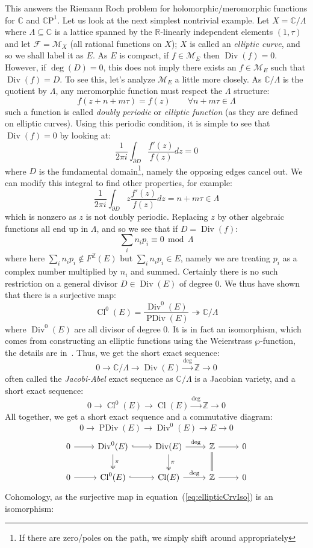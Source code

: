 \documentclass{ut-thesis}
\newcommand{\R}{{\mathbb{R}}}
\newcommand{\Z}{{\mathbb{Z}}}
\newcommand{\C}{{\mathbb{C}}}
\newcommand{\CM}{{\mathcal{M}}}
\newcommand{\CF}{{\mathcal{F}}}
\newcommand{\CP}{{\mathbb{C}\mathrm{P}}}
\newcommand{\sse}{\subseteq}
\renewcommand{\mod}{\,\operatorname{mod}\,}
\newcommand{\Div}{{\operatorname{Div}}}
\newcommand{\PDiv}{{\operatorname{PDiv}}}
\renewcommand{\deg}{{\operatorname{deg}}}
\renewcommand{\div}{{\operatorname{Div}}}
\newcommand{\Cl}{{\operatorname{Cl}}}
\begin{document}
This answers the Riemann Roch problem for holomorphic/meromorphic functions for $\C$ and $\CP^1$. Let us look
at the next simplest nontrivial example. Let $X = \C/\Lambda$ where $\Lambda\sse \C$ is a lattice spanned by
the $\R$-linearly independent elements $(1,\tau)$ and let $\CF = \CM_X$ (all rational functions on $X$); $X$
is called an \emph{elliptic curve}, and so we shall label it as $E$. As $E$ is compact, if $f \in \CM_E$ then
$\div(f) = 0$. However, if $\deg(D) = 0$, this does not imply there exists an $f \in \CM_E$ such that $\div(f)
= D$. To see this, let's analyze $\CM_E$ a little more closely. As $\C/\Lambda$ is the quotient by $\Lambda$,
any meromorphic function must respect the $\Lambda$ structure:
\[
  f(z+n+m\tau) = f(z) \qquad \forall n+m\tau \in \Lambda
\]
such a function is called \emph{doubly periodic} or \emph{elliptic function} (as they are defined on elliptic
curves). Using this periodic condition, it is simple to see that
$\div(f) = 0$ by looking at:
\[
  \frac{1}{2\pi i}\int_{\partial D} \frac{f'(z)}{f(z)}dz = 0
\]
where $D$ is the fundamental domain\footnote{If there are zero/poles on the path, we simply shift around
appropriately}, namely the opposing edges cancel out. We can modify this integral to find other properties,
for example:
\[
  \frac{1}{2\pi i}\int_{\partial D} z\frac{f'(z)}{f(z)}dz = n + m\tau \in \Lambda
\]
which is nonzero as $z$ is not doubly periodic. Replacing $z$ by other algebraic functions all end up in
$\Lambda$, and so we see that if $D = \div(f)$:
\[
  \sum_i n_ip_i \equiv 0 \mod \Lambda
\]
where here $\sum_i n_ip_i\notin F^\Z(E)$ but $\sum_i n_ip_i \in E$, namely we are treating $p_i$ as a complex
number multiplied by $n_i$ and summed. Certainly there is no such restriction on
a general divisor $D \in \Div(E)$ of degree $0$. We thus have shown that there is a surjective map:
\begin{equation}\label{eq:ellipticCrvIso}
  \Cl^0(E) = \frac{\Div^0(E)}{\PDiv(E)} \twoheadrightarrow \C/\Lambda
\end{equation}
where $\Div^0(E)$ are all divisor of degree $0$. It is in fact an isomorphism, which comes from constructing
an elliptic functions using the Weierstrass $\wp$-function, the details are
in~\cite[chapter~5]{NateComplexAnalysis}. Thus, we get the short exact sequence:
\[
  0 \to \C/\Lambda \to \Div(E) \xrightarrow{\deg} \Z \to 0
\]
often called the \emph{Jacobi-Abel} exact sequence as $\C/\Lambda$ is a Jacobian variety, and a short exact sequence:
\[
  0 \to \Cl^0(E) \to \Cl(E) \xrightarrow{\deg} \Z \to 0
\]
All together, we get a short exact sequence and a commutative diagram:
\[
  0 \to \PDiv(E) \to \Div^0(E) \to E \to 0
\]
\[
\begin{tikzcd}
0 \arrow[r] & \mathrm{Div}^0(E) \arrow[r, hook] \arrow[d, two heads, "\pi"] & \mathrm{Div}(E) \arrow[r, "\deg"] \arrow[d, two heads, "\pi"] & \mathbb{Z} \arrow[r] \arrow[d, equals] & 0 \\
0 \arrow[r] & \Cl^0(E) \arrow[r, hook] & \Cl(E) \arrow[r, "\deg"] & \mathbb{Z} \arrow[r] & 0
\end{tikzcd}
\]
Cohomology, as the surjective map in equation~(\ref{eq:ellipticCrvIso}) is an isomorphism:
\end{document}
